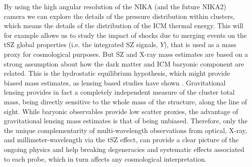 \documentclass[11pt,a4paper,twoside,graphicx,color]{article}
\begin{document}
By using the high angular resolution of the NIKA (and the future NIKA2) camera we can explore the details of the pressure distribution within clusters, which means the details of the distribution of the ICM thermal energy. This will for example allows us to study the impact of shocks due to merging events on the tSZ global properties (i.e. the integrated SZ signals, $Y$), that is used as a mass proxy for cosmological purposes. But SZ and X-ray mass estimates are based on a strong assumption about how the dark matter and ICM baryonic component are related. This is the hydrostatic equilibrium hypothesis, which might provide biased mass estimates, as lensing based studies have shown \citep[e.g. ][]{WtG2014}. Gravitational lensing provides in fact a completely independent measure of the cluster total mass, being directly sensitive to the whole mass of the structure, along the line of sight. While baryonic observables provide low scatter proxies, the advantage of gravitational lensing mass estimates is that of being unbiased. Therefore,  only the the unique complementarity of multi-wavelength observations from optical, X-ray, and millimeter-wavelength via the tSZ effect, can provide a clear picture of the ongoing physics and help breaking degeneracies and systematic effects associated to each probe, which in turn affects any cosmological interpretation.


\end{document}
